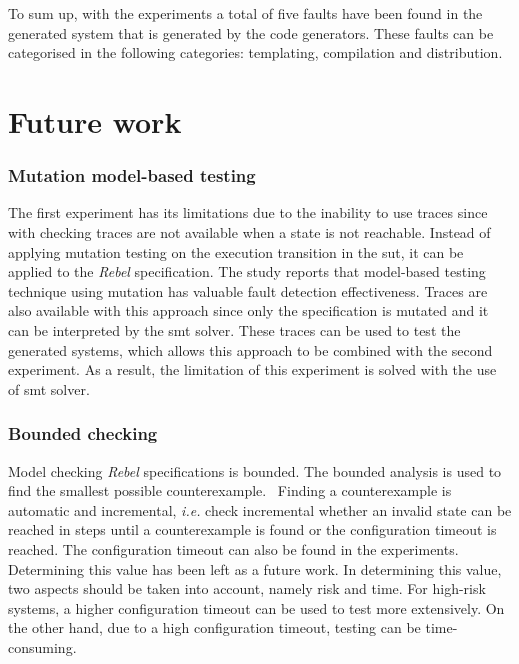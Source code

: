 To sum up, with the experiments a total of five faults have been found in the
generated system that is generated by the code generators.
These faults can be categorised in the following categories: templating,
compilation and distribution.

\clearpage

\section{Future work}

\subsubsection{Mutation model-based testing}

The first experiment has its limitations due to the inability to use traces
since with checking traces are not available when a state is not reachable.
Instead of applying mutation testing on the execution transition in the
\gls{sut}, it can be applied to the \textit{Rebel} specification.
The study \cite{paradkar2005case} reports that model-based testing technique
using mutation has valuable fault detection effectiveness.
Traces are also available with this approach since only the specification is
mutated and it can be interpreted by the \gls{smt} solver.
These traces can be used to test the generated systems, which allows this
approach to be combined with the second experiment. As a result, the limitation
of this experiment is solved with the use of \gls{smt} solver.

\subsubsection{Bounded checking}

Model checking \textit{Rebel} specifications is bounded. The bounded analysis is
used to find the smallest possible counterexample.~\cite[p.~5]{stoel_storm_vinju_bosman_2016}
Finding a counterexample is automatic and incremental,
\textit{i.e.} check incremental whether an invalid state can be reached in
steps until a counterexample is found or the configuration timeout is reached.
The configuration timeout can also be found in the experiments.
Determining this value has been left as a future work.
In determining this value, two aspects should be taken into account,
namely risk and time. For high-risk systems, a higher configuration timeout can
be used to test more extensively. On the other hand, due to a high configuration
timeout, testing can be time-consuming.

